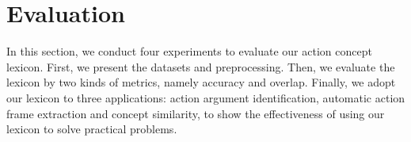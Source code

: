 \section{Evaluation}
\label{sec:eval}

In this section, we conduct four experiments to evaluate our action concept lexicon.
First, we present the datasets and preprocessing. Then, we evaluate the lexicon
by two kinds of metrics, namely accuracy and overlap. Finally, we adopt our
lexicon to three applications: action argument identification, automatic action
frame extraction and concept similarity, to show the effectiveness of using our
lexicon to solve practical problems.







